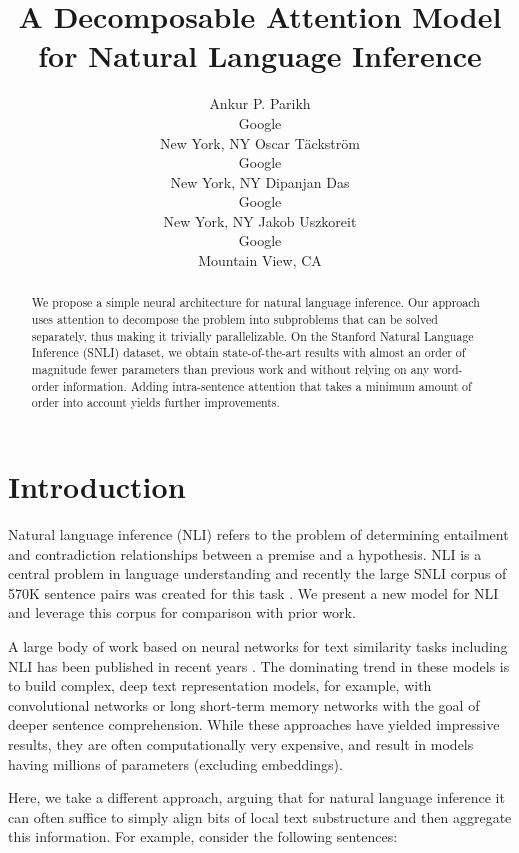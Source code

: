 \documentclass[11pt,letterpaper]{article}
\title{A Decomposable Attention Model for Natural Language Inference}
\author{Ankur P. Parikh \\ Google \\ New York, NY   \And
Oscar T{\"{a}}ckstr{\"{o}}m \\ Google \\ New York, NY   \And
Dipanjan Das \\ Google \\ New York, NY   \And
Jakob Uszkoreit \\ Google \\ Mountain View, CA  \ANDEMAIL { {\tt \{aparikh,oscart,dipanjand,uszkoreit\}@google.com} } }
\date{}
\begin{document}
\maketitle

\begin{abstract}
We propose a simple neural architecture for natural language inference.
Our approach uses attention to decompose the problem into subproblems that can be solved separately, thus making it trivially parallelizable.
On the Stanford Natural Language Inference (SNLI) dataset, we obtain state-of-the-art results with almost an order of magnitude fewer parameters than previous work and without relying on any word-order information.
Adding intra-sentence attention that takes a minimum amount of order into account yields further improvements.
\end{abstract}

\vspace{-0.1cm}
\section{Introduction}
\vspace{-0.1cm}

Natural language inference (NLI) refers to the problem of determining entailment and contradiction relationships between a premise and a hypothesis.
NLI is a central problem in language understanding \cite{katz1972semantic,bosmarkert2005,benthem2008brief,MacCartney:2009} and
recently the large SNLI corpus of 570K sentence pairs was created for this task \cite{bowman2015large}.
We present a new model for NLI and leverage this corpus for comparison with prior work.


A large body of work based on neural networks for text similarity tasks including NLI has been published in recent years \cite[\textit{inter alia}]{hu2014convolutional,rocktaschel2015reasoning,wang2015learning,yin2015abcnn}.
The dominating trend in these models is to build complex, deep text representation models, for example, with convolutional networks \cite[CNNs henceforth]{le1990handwritten} or long short-term memory networks \cite[LSTMs henceforth]{hochreiter1997long} with the goal of deeper sentence comprehension. While these approaches have yielded impressive results, they are often computationally very expensive, and result in models having millions of parameters (excluding embeddings).

Here, we take a different approach, arguing that for natural language inference it can often suffice to simply align bits of local text substructure and then aggregate this 
information. For example, consider the following sentences:
\end{document}
